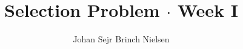 \makeatletter %
\def\maketitle{%
 \null
 \thispagestyle{empty}%
 \vfill
 \begin{center}\leavevmode
   \normalfont
   \LARGE{\raggedleft \@title\par}%
   \hrulefill\par
   \large{\raggedleft \subtitle\par}%
   \vskip 2cm
   {\today\par}%
 \end{center}%
 \vfill
 \begin{flushleft}
   {\large \@author } \\
   {\footnotesize \suplementInfo }
 \end{flushleft}
 \clearpage %
}
\makeatother %
\title{Selection Problem $\cdot$ Week I}

\def\subtitle{Data Structures: Theory and Practice}

\author{Johan Sejr Brinch Nielsen} \def\suplementInfo{

\kern 5pt \hrule width 11pc \kern 5pt

\begin{tabular}{ll}
Email: & zerrez@diku.dk  \\
Cpr.:  & 260886-2547
\end{tabular}

\kern 5pt \hrule width 11pc \kern 5pt

Dept. of Computer Science,  \\
University of Copenhagen

}
